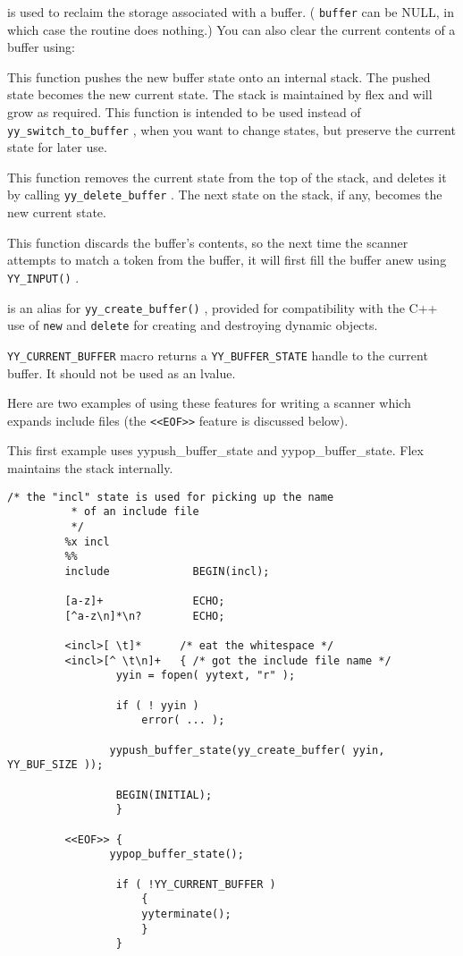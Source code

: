 \documentclass[openany,oneside]{book}
\begin{document}
is used to reclaim the storage associated with a buffer.  ( \verb`buffer` can be NULL, in which case the routine does nothing.)  You can also clear
the current contents of a buffer using:



This function pushes the new buffer state onto an internal stack. The pushed
state becomes the new current state. The stack is maintained by flex and will
grow as required. This function is intended to be used instead of \verb`yy_switch_to_buffer` , when you want to change states, but preserve the
current state for later use.



This function removes the current state from the top of the stack, and deletes
it by calling \verb`yy_delete_buffer` .  The next state on the stack, if any,
becomes the new current state.



This function discards the buffer's contents,
so the next time the scanner attempts to match a token from the
buffer, it will first fill the buffer anew using \verb`YY_INPUT()` .

is an alias for \verb`yy_create_buffer()` ,
provided for compatibility with the C++ use of \verb`new` and \verb`delete` for creating and destroying dynamic objects.

 \verb`YY_CURRENT_BUFFER` macro returns a \verb`YY_BUFFER_STATE` handle to the
current buffer. It should not be used as an lvalue.

Here are two examples of using these features for writing a scanner
which expands include files (the \verb`<<EOF>>` feature is discussed below).

This first example uses yypush\_{}buffer\_{}state and yypop\_{}buffer\_{}state. Flex
maintains the stack internally.


\begin{verbatim}
/* the "incl" state is used for picking up the name
          * of an include file
          */
         %x incl
         %%
         include             BEGIN(incl);
     
         [a-z]+              ECHO;
         [^a-z\n]*\n?        ECHO;
     
         <incl>[ \t]*      /* eat the whitespace */
         <incl>[^ \t\n]+   { /* got the include file name */
                 yyin = fopen( yytext, "r" );
     
                 if ( ! yyin )
                     error( ... );
     
     			yypush_buffer_state(yy_create_buffer( yyin, YY_BUF_SIZE ));
     
                 BEGIN(INITIAL);
                 }
     
         <<EOF>> {
     			yypop_buffer_state();
     
                 if ( !YY_CURRENT_BUFFER )
                     {
                     yyterminate();
                     }
                 }
\end{verbatim}
\end{document}
